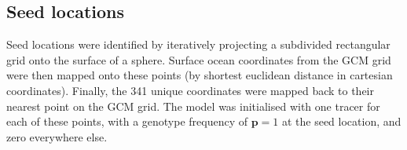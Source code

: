 \documentclass[12pt]{article}
\begin{document}
\subsection{Seed locations}

Seed locations were identified by iteratively projecting a subdivided rectangular grid onto the surface of a sphere. Surface ocean coordinates from the GCM grid were then mapped onto these points (by shortest euclidean distance in cartesian coordinates). Finally, the 341 unique coordinates were mapped back to their nearest point on the GCM grid. The model was initialised with one tracer for each of these points, with a genotype frequency of $\mathbf{p} = 1$ at the seed location, and zero everywhere else. 




\end{document}
